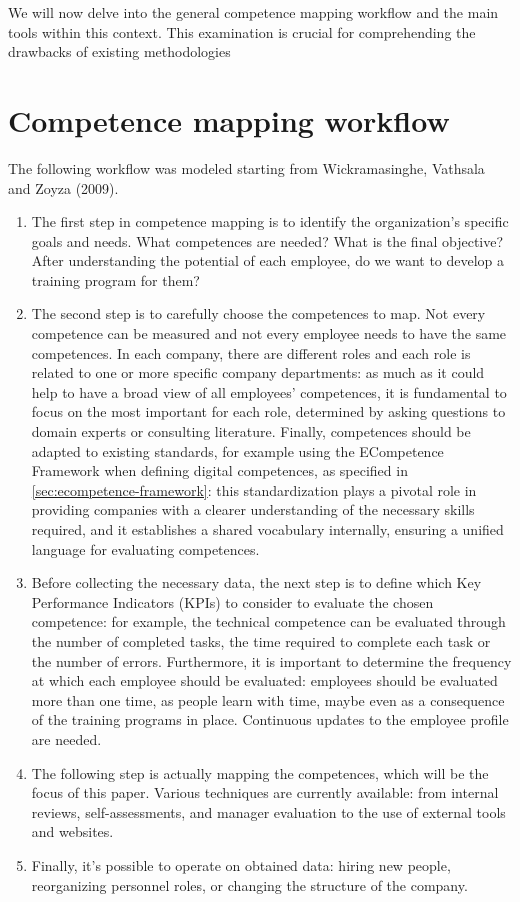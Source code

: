 We will now delve into the general competence mapping workflow and the main tools within this context. This examination is crucial for comprehending the drawbacks of existing methodologies

\section{Competence mapping workflow}

The following workflow was modeled starting from Wickramasinghe, Vathsala and Zoyza (2009)\cite{srilanka_mapping_workflow}.

\begin{enumerate}
      \item The first step in competence mapping is to identify the organization's specific goals and needs. What competences are needed? What is the final objective? After understanding the potential of each employee, do we want to develop a training program for them?
      \item The second step is to carefully choose the competences to map. Not every competence can be measured and not every employee needs to have the same competences. In each company, there are different roles and each role is related to one or more specific company departments: as much as it could help to have a broad view of all employees' competences, it is fundamental to focus on the most important for each role, determined by asking questions to domain experts or consulting literature. Finally, competences should be adapted to existing standards, for example using the ECompetence Framework when defining digital competences, as specified in \ref{sec:ecompetence-framework}: this standardization plays a pivotal role in providing companies with a clearer understanding of the necessary skills required, and it establishes a shared vocabulary internally, ensuring a unified language for evaluating competences.
      \item Before collecting the necessary data, the next step is to define which Key Performance Indicators (KPIs) to consider to evaluate the chosen competence: for example, the technical competence can be evaluated through the number of completed tasks, the time required to complete each task or the number of errors. Furthermore, it is important to determine the frequency at which each employee should be evaluated: employees should be evaluated more than one time, as people learn with time, maybe even as a consequence of the training programs in place. Continuous updates to the employee profile are needed.
      \item The following step is actually mapping the competences, which will be the focus of this paper. Various techniques are currently available: from internal reviews, self-assessments, and manager evaluation to the use of external tools and websites.
      \item Finally, it's possible to operate on obtained data: hiring new people, reorganizing personnel roles, or changing the structure of the company.
\end{enumerate}


